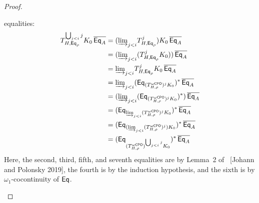 \documentclass[acmsmall,review,anonymous]{acmart}
\theoremstyle{definition}
\begin{document}
\begin{proof}
\begin{itemize}
{  equalities:
\[
\begin{split}
T^{\bigcup_{j<i}j}_{H,\mathsf{Eq}_\rho} K_0\, \overline{\mathsf{Eq}_A}
&= ({{\underrightarrow{\lim}}_{j < i}{T^j_{H,\mathsf{Eq}_\rho}}}) K_0\, \overline{\mathsf{Eq}_A}\\
&= ({{\underrightarrow{\lim}}_{j < i}{(T^j_{H,\mathsf{Eq}_\rho} K_0)}})\, \overline{\mathsf{Eq}_A}\\
&= {{\underrightarrow{\lim}}_{j < i}{T^j_{H,\mathsf{Eq}_\rho} K_0\, \overline{\mathsf{Eq}_A}}}\\
&= {{\underrightarrow{\lim}}_{j < i}{(\mathsf{Eq}_{(T^{\omega\mathsf{CPO}}_{H,\rho})^j K_0})^*\,
  \overline{\mathsf{Eq}_A}}}\\
&= ({{\underrightarrow{\lim}}_{j < i}{(\mathsf{Eq}_{(T^{\omega\mathsf{CPO}}_{H,\rho})^j K_0})^*)\,
  \overline{\mathsf{Eq}_A}}}\\
&= (\mathsf{Eq}_{{{\underrightarrow{\lim}}_{j < i}{(T^{\omega\mathsf{CPO}}_{H,\rho})^j K_0}}})^*\,
\overline{\mathsf{Eq}_A}\\
&= (\mathsf{Eq}_{({{\underrightarrow{\lim}}_{j < i}{(T^{\omega\mathsf{CPO}}_{H,\rho})^j}}) K_0})^*\,
\overline{\mathsf{Eq}_A}\\
&= (\mathsf{Eq}_{(T^{\omega\mathsf{CPO}}_{H,\rho})^{\bigcup_{j < i}j} K_0})^*\, \overline{\mathsf{Eq}_A}\\
\end{split}
\]
Here, the second, third, fifth, and seventh equalities are by Lemma~2
of~{\color{red} [Johann and Polonsky 2019]}, the fourth is by the
induction hypothesis, and the sixth is by $\omega_1$-cocontinuity of
$\mathsf{Eq}$.  }
 

\vspace*{0.1in}


\end{itemize}
\end{proof}
\end{document}
